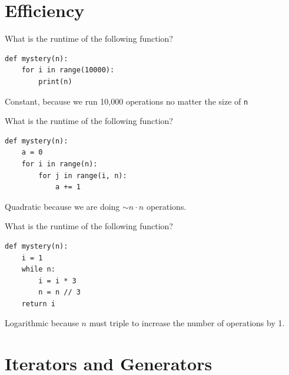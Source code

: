 \documentclass{exam}
\newlength{\currentparskip}
\newenvironment{blocksection}
{
    \setlength{\currentparskip}{\parskip}%
    \begin{minipage}{\linewidth}
    \setlength{\parskip}{\currentparskip}%
}
{
    \end{minipage}
}
\begin{document}
\section{Efficiency}
\begin{questions}
\begin{blocksection}
\question What is the runtime of the following function?
\begin{lstlisting}
def mystery(n):
    for i in range(10000):
        print(n)
\end{lstlisting}

\begin{solution}[1in]
Constant, because we run 10,000 operations no matter the size of \lstinline{n}
\end{solution}
\end{blocksection}

\begin{blocksection}
\question What is the runtime of the following function?
\begin{lstlisting}
def mystery(n):
    a = 0
    for i in range(n):
        for j in range(i, n):
            a += 1
\end{lstlisting}

\begin{solution}[1in]
Quadratic because we are doing $\sim n\cdot n$ operations.
\end{solution}
\end{blocksection}

\begin{blocksection}
    \question What is the runtime of the following function?
    \begin{lstlisting}
def mystery(n):
    i = 1
    while n:
        i = i * 3
        n = n // 3
    return i
    \end{lstlisting}
    
\begin{solution}[1in]
Logarithmic because $n$ must triple to increase the number of operations by 1. 
\end{solution}
\end{blocksection}

\end{questions}

\section{Iterators and Generators}
\end{document}
